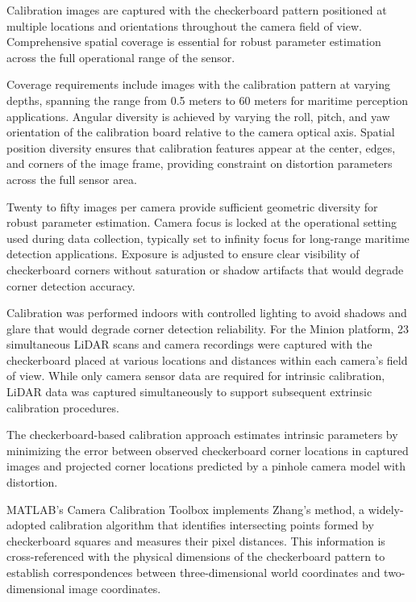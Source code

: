 \documentclass{erauthesis}
\begin{document}

Calibration images are captured with the checkerboard pattern positioned at multiple locations and orientations throughout the camera field of view.
Comprehensive spatial coverage is essential for robust parameter estimation across the full operational range of the sensor.

Coverage requirements include images with the calibration pattern at varying depths, spanning the range from 0.5 meters to 60 meters for maritime perception applications.
Angular diversity is achieved by varying the roll, pitch, and yaw orientation of the calibration board relative to the camera optical axis.
Spatial position diversity ensures that calibration features appear at the center, edges, and corners of the image frame, providing constraint on distortion parameters across the full sensor area.

Twenty to fifty images per camera provide sufficient geometric diversity for robust parameter estimation.
Camera focus is locked at the operational setting used during data collection, typically set to infinity focus for long-range maritime detection applications.
Exposure is adjusted to ensure clear visibility of checkerboard corners without saturation or shadow artifacts that would degrade corner detection accuracy.

Calibration was performed indoors with controlled lighting to avoid shadows and glare that would degrade corner detection reliability.
For the Minion platform, 23 simultaneous LiDAR scans and camera recordings were captured with the checkerboard placed at various locations and distances within each camera's field of view.
While only camera sensor data are required for intrinsic calibration, LiDAR data was captured simultaneously to support subsequent extrinsic calibration procedures.


The checkerboard-based calibration approach estimates intrinsic parameters by minimizing the error between observed checkerboard corner locations in captured images and projected corner locations predicted by a pinhole camera model with distortion.

MATLAB's Camera Calibration Toolbox implements Zhang's method, a widely-adopted calibration algorithm that identifies intersecting points formed by checkerboard squares and measures their pixel distances.
This information is cross-referenced with the physical dimensions of the checkerboard pattern to establish correspondences between three-dimensional world coordinates and two-dimensional image coordinates.
\end{document}
